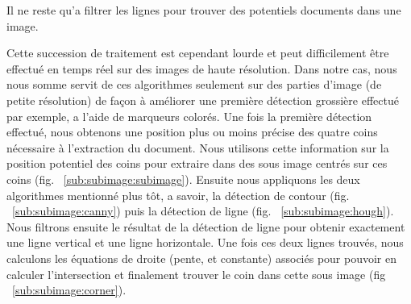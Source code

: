 Il ne reste qu'a filtrer les lignes pour trouver des potentiels documents dans une image.

Cette succession de traitement est cependant lourde et peut difficilement être effectué en temps réel sur des images de haute résolution. 
Dans notre cas, nous nous somme servit de ces algorithmes seulement sur des parties d'image (de petite résolution) de façon à améliorer une première détection grossière effectué par exemple, a l'aide de marqueurs colorés. Une fois la première détection effectué, nous obtenons une position plus ou moins précise des quatre coins nécessaire à l'extraction du document.
Nous utilisons cette information sur la position potentiel des coins pour extraire dans des sous image centrés sur ces coins (fig. ~\ref{sub:subimage:subimage}). Ensuite nous appliquons les deux algorithmes mentionné plus tôt, a savoir, la détection de contour (fig. ~\ref{sub:subimage:canny}) puis la détection de ligne (fig. ~\ref{sub:subimage:hough}). Nous filtrons ensuite le résultat de la détection de ligne pour obtenir exactement une ligne vertical et une ligne horizontale. Une fois ces deux lignes trouvés, nous calculons les équations de droite (pente, et constante) associés pour pouvoir en calculer l'intersection et finalement trouver le coin dans cette sous image (fig ~\ref{sub:subimage:corner}).

